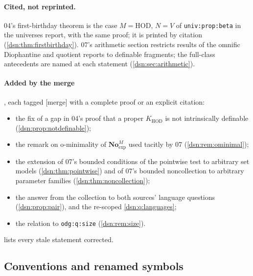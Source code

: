 \documentclass[11pt,a4paper]{article}
\numberwithin{equation}{section}
\theoremstyle{definition}
\theoremstyle{remark}
\newcommand{\No}{\mathbf{No}}
\newcommand{\HOD}{\mathrm{HOD}}
\newcommand{\KH}{K_{\HOD}}
\newcommand{\mergetag}{\textup{\textsf{\small[merge]}}}
\newcommand{\lbl}[1]{\nolinkurl{#1}}
\begin{document}
\paragraph{Cited, not reprinted.} 04's first-birthday theorem is the case
$M=\HOD$, $N=V$ of \lbl{univ:prop:beta} in the universes report, with the
same proof; it is printed by citation (\cref{dsn:thm:firstbirthday}).
07's arithmetic section restricts results of the omnific Diophantine and
quotient reports to definable fragments; the full-class antecedents are
named at each statement (\cref{dsn:sec:arithmetic}).

\paragraph{Added by the merge}, each tagged \mergetag{} with a complete
proof or an explicit citation:
\begin{itemize}
\item the fix of a gap in 04's proof that a proper $\KH$ is not
intrinsically definable (\cref{dsn:prop:notdefinable});
\item the remark on o-minimality of $\No^M_{\exp}$ used tacitly by 07
(\cref{dsn:rem:ominimal});
\item the extension of 07's bounded conditions of the pointwise test to
arbitrary set models (\cref{dsn:thm:pointwise}) and of 07's bounded
noncollection to arbitrary parameter families
(\cref{dsn:thm:noncollection});
\item the answer from the collection to both sources' language questions
(\cref{dsn:prop:pair}), and the re-scoped \cref{dsn:q:languages};
\item the relation to \lbl{odg:q:size} (\cref{dsn:rem:size}).
\end{itemize}
 lists every stale statement corrected.

\subsection{Conventions and renamed symbols}\label{dsn:sub:conventions}
\end{document}

